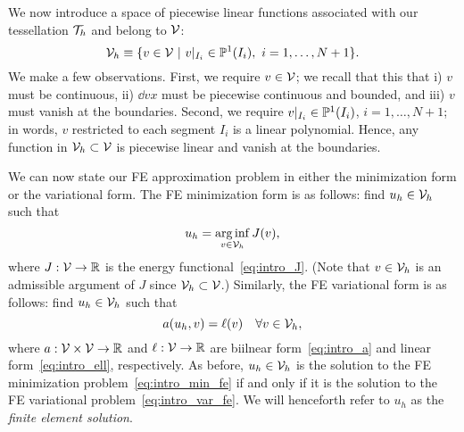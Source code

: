 We now introduce a space of piecewise linear functions associated with our tessellation $\mathcal{T}_h$ and belong to $\mathcal{V}$:
\begin{equation}
  \mathcal{V}_h \equiv \{ v \in \mathcal{V} \ | \ v|_{I_i} \in \mathbb{P}^1(I_i), \ i = 1,\dots,N+1\}.
  \label{eq:intro_Vh}
\end{equation}
We make a few observations.  First, we require $v \in \mathcal{V}$; we recall that this that i) $v$ must be continuous, ii) $\dd{v}{x}$ must be piecewise continuous and bounded, and iii) $v$ must vanish at the boundaries.  Second, we require $v|_{I_i} \in \mathbb{P}^1(I_i)$, $i = 1,\dots,N+1$; in words, $v$ restricted to each segment $I_i$ is a linear polynomial.  Hence, any function in $\mathcal{V}_h \subset \mathcal{V}$ is piecewise linear and vanish at the boundaries.

We can now state our FE approximation problem in either the minimization form or the variational form.  The FE minimization form is as follows: find $u_h \in \mathcal{V}_h$ such that
\begin{equation}
  u_h = \operatorname*{arg\,inf}_{v \in \mathcal{V}_h} J(v),
  \label{eq:intro_min_fe}
\end{equation}
where $J: \mathcal{V} \to \mathbb{R}$ is the energy functional~\eqref{eq:intro_J}. (Note that $v \in \mathcal{V}_h$ is an admissible argument of $J$ since $\mathcal{V}_h \subset \mathcal{V}$.) Similarly, the FE variational form is as follows: find $u_h \in \mathcal{V}_h$ such that
\begin{equation}
  a(u_h,v) = \ell(v) \quad \forall v \in \mathcal{V}_h,
  \label{eq:intro_var_fe}
\end{equation}
where $a: \mathcal{V} \times \mathcal{V} \to \mathbb{R}$ and $\ell: \mathcal{V} \to \mathbb{R}$ are biilnear form~\eqref{eq:intro_a} and linear form~\eqref{eq:intro_ell}, respectively.  As before, $u_h \in \mathcal{V}_h$ is the solution to the FE minimization problem~\eqref{eq:intro_min_fe} if and only if it is the solution to the FE variational problem~\eqref{eq:intro_var_fe}. We will henceforth refer to $u_h$ as the \emph{finite element solution}.


